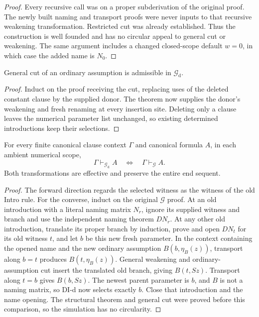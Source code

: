 \begin{proof}
Every recursive call was on a proper subderivation of the original proof.
The newly built naming and transport proofs were never inputs to that
recursive weakening transformation. Restricted cut was already established.
Thus the construction is well founded and has no circular appeal to general
cut or weakening. The same argument includes a changed closed-scope default
$w=0$, in which case the added name is $N_0$.
\end{proof}

\begin{corollary}
General cut of an ordinary assumption is admissible in
$\mathcal G_{\mathrm d}$.
\end{corollary}
\begin{proof}
Induct on the proof receiving the cut, replacing uses of the deleted constant
clause by the supplied donor. The theorem now supplies the donor's weakening
and fresh renaming at every insertion site. Deleting only a clause leaves
the numerical parameter list unchanged, so existing determined introductions
keep their selections.
\end{proof}

\begin{theorem}
For every finite canonical clause context $\Gamma$ and canonical formula $A$,
in each ambient numerical scope,
\[
 \Gamma\vdash_{\mathcal G_{\mathrm d}}A
 \quad\Longleftrightarrow\quad
 \Gamma\vdash_{\mathcal G}A.
\]
Both transformations are effective and preserve the entire end sequent.
\end{theorem}
\begin{proof}
The forward direction regards the selected witness as the witness of the
old Intro rule. For the converse, induct on the original $\mathcal G$ proof.
At an old introduction with a literal naming matrix $N_r$, ignore its
supplied witness and branch and use the independent naming theorem $D N_r$.
At any other old introduction, translate its proper branch by induction,
prove and open $D N_t$ for its old witness $t$, and let $b$ be this new
fresh parameter. In the context containing the opened name and the new ordinary
assumption $B(b,\eta_B(z))$, transport along $b=t$ produces
$B(t,\eta_B(z))$. General weakening and ordinary-assumption cut insert the
translated old branch, giving $B(t,Sz)$. Transport along $t=b$ gives
$B(b,Sz)$. The newest parent parameter is $b$, and
$B$ is not a naming matrix, so DI-d now selects exactly $b$. Close that
introduction and the name opening. The structural theorem and general cut
were proved before this comparison, so the simulation has no circularity.
\end{proof}


